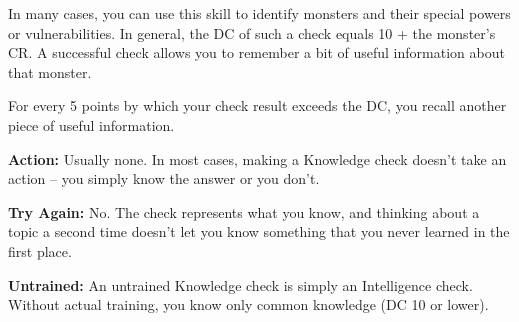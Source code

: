 In many cases, you can use this skill to identify monsters and their special powers or vulnerabilities. In general, the DC of such a check equals 10 + the monster's CR. A successful check allows you to remember a bit of useful information about that monster.

For every 5 points by which your check result exceeds the DC, you recall another piece of useful information.

\textbf{Action:} Usually none. In most cases, making a Knowledge check doesn't take an action -- you simply know the answer or you don't.

\textbf{Try Again:} No. The check represents what you know, and thinking about a topic a second time doesn't let you know something that you never learned in the first place.

\textbf{Untrained:} An untrained Knowledge check is simply an Intelligence check. Without actual training, you know only common knowledge (DC 10 or lower).
